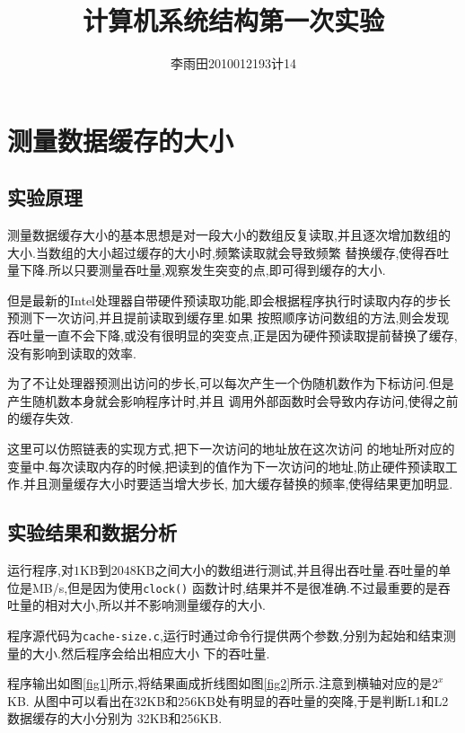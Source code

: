 \documentclass[adobefonts, nocap]{ctexart}
\begin{document}
  \title{计算机系统结构第一次实验}
  \author{李雨田\hspace{1em}2010012193\hspace{1em}计14}
  \maketitle
  \tableofcontents
  \section{测量数据缓存的大小}
    \subsection{实验原理}
      测量数据缓存大小的基本思想是对一段大小的数组反复读取,并且逐次增加数组的大小.当数组的大小超过缓存的大小时,频繁读取就会导致频繁
      替换缓存,使得吞吐量下降.所以只要测量吞吐量,观察发生突变的点,即可得到缓存的大小.

      但是最新的Intel处理器自带硬件预读取功能,即会根据程序执行时读取内存的步长预测下一次访问,并且提前读取到缓存里.如果
      按照顺序访问数组的方法,则会发现吞吐量一直不会下降,或没有很明显的突变点,正是因为硬件预读取提前替换了缓存,没有影响到读取的效率.

      为了不让处理器预测出访问的步长,可以每次产生一个伪随机数作为下标访问.但是产生随机数本身就会影响程序计时,并且
      调用外部函数时会导致内存访问,使得之前的缓存失效.

      这里可以仿照链表的实现方式,把下一次访问的地址放在这次访问
      的地址所对应的变量中.每次读取内存的时候,把读到的值作为下一次访问的地址,防止硬件预读取工作.并且测量缓存大小时要适当增大步长,
      加大缓存替换的频率,使得结果更加明显.
    \subsection{实验结果和数据分析}
      运行程序,对$1$KB到$2048$KB之间大小的数组进行测试,并且得出吞吐量.吞吐量的单位是MB/s,但是因为使用\texttt{clock()}
      函数计时,结果并不是很准确.不过最重要的是吞吐量的相对大小,所以并不影响测量缓存的大小.

      程序源代码为\texttt{cache-size.c},运行时通过命令行提供两个参数,分别为起始和结束测量的大小.然后程序会给出相应大小
      下的吞吐量.

      程序输出如图\ref{fig1}所示,将结果画成折线图如图\ref{fig2}所示.注意到横轴对应的是$2^{x}$KB.
      从图中可以看出在$32$KB和$256$KB处有明显的吞吐量的突降,于是判断L1和L2数据缓存的大小分别为
      32KB和256KB.
\end{document}
